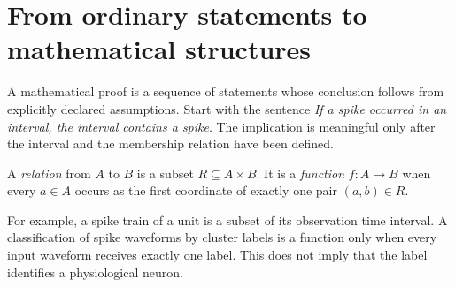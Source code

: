 \chapter{From ordinary statements to mathematical structures}
A mathematical proof is a sequence of statements whose conclusion follows
from explicitly declared assumptions. Start with the sentence
\emph{If a spike occurred in an interval, the interval contains a spike}.
The implication is meaningful only after the interval and the membership
relation have been defined.

\begin{definition}
A \emph{relation} from $A$ to $B$ is a subset $R\subseteq A\times B$.
It is a \emph{function} $f:A\to B$ when every $a\in A$ occurs as
the first coordinate of exactly one pair $(a,b)\in R$.
\end{definition}
For example, a spike train of a unit is a subset of its observation
time interval. A classification of spike waveforms by cluster labels is
a function only when every input waveform receives exactly one label.
This does not imply that the label identifies a physiological neuron.

